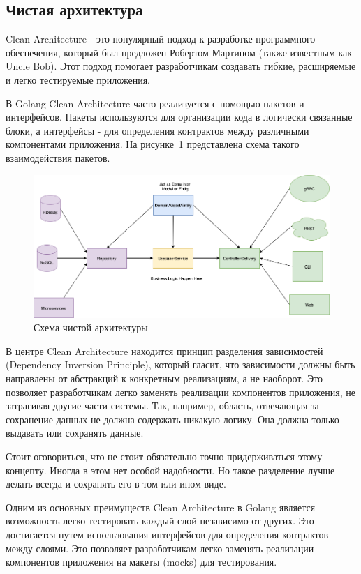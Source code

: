 \subsection{Чистая архитектура}
Clean Architecture - это популярный подход к разработке программного обеспечения, 
который был предложен Робертом Мартином (также известным как Uncle Bob). 
Этот подход помогает разработчикам создавать гибкие, расширяемые и легко тестируемые приложения.

В Golang Clean Architecture часто реализуется с помощью пакетов и интерфейсов. 
Пакеты используются для организации кода в логически связанные блоки, 
а интерфейсы - для определения контрактов между различными компонентами приложения.
На рисунке~\ref{clean-arch-pic} представлена схема такого взаимодействия пакетов.

\begin{figure}
    \includegraphics[scale=0.5]{imgs/clean-arch}
    \caption{Схема чистой архитектуры}
    \label{clean-arch-pic}
\end{figure}

В центре Clean Architecture находится принцип разделения зависимостей (Dependency Inversion Principle), который гласит, что зависимости должны быть направлены от абстракций к конкретным реализациям, а не наоборот.
Это позволяет разработчикам легко заменять реализации компонентов приложения, не затрагивая другие части системы.
Так, например, область, отвечающая за сохранение данных не должна содержать никакую логику.
Она должна только выдавать или сохранять данные.

Стоит оговориться, что не стоит обязательно точно придерживаться этому концепту.
Иногда в этом нет особой надобности.
Но такое разделение лучше делать всегда и сохранять его в том или ином виде.

Одним из основных преимуществ Clean Architecture в Golang является возможность легко тестировать каждый слой независимо от других. 
Это достигается путем использования интерфейсов для определения контрактов между слоями. 
Это позволяет разработчикам легко заменять реализации компонентов приложения на макеты (mocks) для тестирования.

